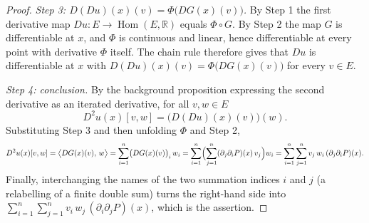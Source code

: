 \begin{proof}
\emph{Step 3: $D(Du)(x)(v)=\Phi\bigl(DG(x)(v)\bigr)$.} By Step 1 the first
derivative map $Du:E\to\operatorname{Hom}(E,\mathbb{R})$ equals $\Phi\circ G$. By
Step 2 the map $G$ is differentiable at $x$, and $\Phi$ is continuous and linear,
hence differentiable at every point with derivative $\Phi$ itself. The chain rule
therefore gives that $Du$ is differentiable at $x$ with
$D(Du)(x)(v)=\Phi\bigl(DG(x)(v)\bigr)$ for every $v\in E$.

\emph{Step 4: conclusion.} By the background proposition expressing the second
derivative as an iterated derivative, for all $v,w\in E$
\[
  D^2u(x)[v,w]=\bigl(D(Du)(x)(v)\bigr)(w).
\]
Substituting Step 3 and then unfolding $\Phi$ and Step 2,
\[
  D^2u(x)[v,w]
  =\bigl\langle DG(x)(v),\,w\bigr\rangle
  =\sum_{i=1}^{n}\bigl(DG(x)(v)\bigr)_i\,w_i
  =\sum_{i=1}^{n}\Bigl(\sum_{j=1}^{n}(\partial_j\partial_iP)(x)\,v_j\Bigr)w_i
  =\sum_{i=1}^{n}\sum_{j=1}^{n}v_j\,w_i\,(\partial_j\partial_iP)(x).
\]
Finally, interchanging the names of the two summation indices $i$ and $j$ (a
relabelling of a finite double sum) turns the right-hand side into
$\sum_{i=1}^{n}\sum_{j=1}^{n}v_i\,w_j\,(\partial_i\partial_jP)(x)$, which is the
assertion.
\end{proof}
